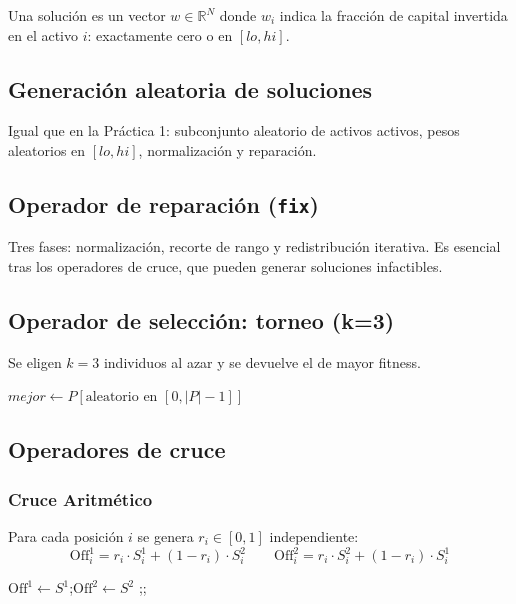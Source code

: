 \documentclass[12pt,a4paper]{article}
\begin{document}
Una solución es un vector $w \in \mathbb{R}^N$ donde $w_i$ indica la fracción de capital
invertida en el activo $i$: exactamente cero o en $[lo, hi]$.

\subsection{Generación aleatoria de soluciones}

Igual que en la Práctica 1: subconjunto aleatorio de activos activos, pesos aleatorios en
$[lo, hi]$, normalización y reparación.

\subsection{Operador de reparación (\texttt{fix})}

Tres fases: normalización, recorte de rango y redistribución iterativa. Es esencial tras
los operadores de cruce, que pueden generar soluciones infactibles.

\subsection{Operador de selección: torneo (k=3)}

Se eligen $k=3$ individuos al azar y se devuelve el de mayor fitness.

\begin{algorithm}[H]
\caption{Torneo ($k=3$)}
 
$mejor \leftarrow P[\text{aleatorio en } [0,|P|-1]]$\;
\end{algorithm}

\subsection{Operadores de cruce}

\subsubsection*{Cruce Aritmético}
Para cada posición $i$ se genera $r_i \in [0,1]$ independiente:
\[
  \text{Off}^1_i = r_i \cdot S^1_i + (1-r_i) \cdot S^2_i
  \qquad
  \text{Off}^2_i = r_i \cdot S^2_i + (1-r_i) \cdot S^1_i
\]

\begin{algorithm}[H]
\caption{Cruce Aritmético($S^1$, $S^2$, problema)}
 
$\text{Off}^1 \leftarrow S^1$;\quad $\text{Off}^2 \leftarrow S^2$\;
;\quad {};\quad {}
\end{algorithm}
\end{document}
